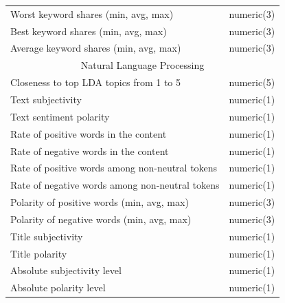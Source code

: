 \documentclass[11pt]{article}
\begin{document}
\begin{table}[h]
\begin{tabular}{ l | l }
            Worst keyword shares (min, avg, max) & numeric(3) \\
            Best keyword shares (min, avg, max) & numeric(3) \\
            Average keyword shares (min, avg, max) & numeric(3) \\
            \hline
            \multicolumn{2}{c}{Natural Language Processing}\\
            \hline
            Closeness to top LDA topics from 1 to 5 & numeric(5) \\
            Text subjectivity & numeric(1) \\
            Text sentiment polarity & numeric(1) \\
            Rate of positive words in the content & numeric(1) \\
            Rate of negative words in the content & numeric(1) \\
            Rate of positive words among non-neutral tokens & numeric(1) \\
            Rate of negative words among non-neutral tokens & numeric(1) \\
            Polarity of positive words (min, avg, max) & numeric(3) \\
            Polarity of negative words (min, avg, max) & numeric(3) \\
            Title subjectivity & numeric(1) \\
            Title polarity & numeric(1) \\
            Absolute subjectivity level & numeric(1) \\
            Absolute polarity level & numeric(1) \\
            \hline\hline
        \end{tabular}
        \label{table:1}
    \end{table}
\end{document}
